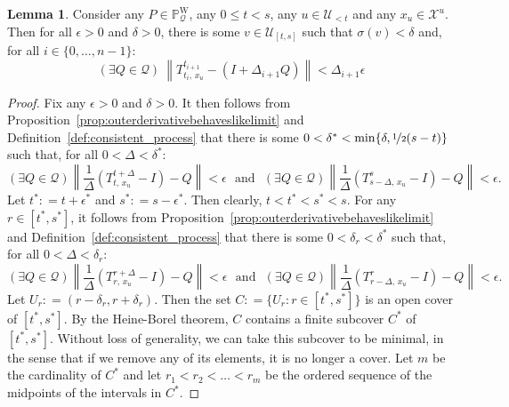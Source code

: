 \documentclass[10pt,a4paper]{paper}
\theoremstyle{definition}
\newtheorem{lemma}[theorem]{Lemma}
\newcommand{\states}{\mathcal{X}}
\newcommand{\processes}{\mathbb{P}}
\newcommand{\wprocesses}{\processes^{\mathrm{W}}}
\newcommand{\rateset}{\mathcal{Q}}
\newcommand{\norm}[1]{\left\lVert #1 \right\rVert}
\newcommand{\coloneqq}{:\!=}
\begin{document}
\begin{lemma}\label{lemma:bound_on_linear_approx_partition}
Consider any $P\in\wprocesses_\rateset$, any $0\leq t<s$, any $u\in\mathcal{U}_{<t}$ and any $x_u\in\states^u$. Then for all $\epsilon>0$ and $\delta>0$, there is some $v\in\mathcal{U}_{[t,s]}$ such that $\sigma(v)<\delta$ and, for all $i\in\{0,\dots,n-1\}$:
\begin{equation*}
(\exists Q\in\rateset)
~
\norm{
T^{t_{i+1}}_{t_i,\,x_u}-(I+\Delta_{i+1}Q)
}<\Delta_{i+1}\epsilon
\end{equation*}
\end{lemma}
\begin{proof}
Fix any $\epsilon>0$ and $\delta>0$. It then follows from Proposition~\ref{prop:outerderivativebehaveslikelimit} and Definition~\ref{def:consistent_process} that there is some $0<\delta^*<\min\{\delta,\nicefrac{1}{2}(s-t)\}$ such that, for all $0<\Delta<\delta^*$:
\begin{equation}\label{eq:epsilonboundsforboundsinlemma}
(\exists Q\in\rateset)
\norm{\frac{1}{\Delta}
(T^{t+\Delta}_{t,\,x_u}-I)-Q}<\epsilon
\text{~~and~~}
(\exists Q\in\rateset)
\norm{\frac{1}{\Delta}
(T^{s}_{s-\Delta,\,x_u}-I)-Q}<\epsilon.
\end{equation}
Let $t^*\coloneqq t+\epsilon^*$ and $s^*\coloneqq s-\epsilon^*$. Then clearly, $t<t^*<s^*<s$.
For any $r\in[t^*,s^*]$, it follows from Proposition~\ref{prop:outerderivativebehaveslikelimit} and Definition~\ref{def:consistent_process} that there is some $0<\delta_r<\delta^*$ such that, for all $0<\Delta<\delta_r$:
\begin{equation}\label{eq:epsilonboundsforlemma}
(\exists Q\in\rateset)
\norm{\frac{1}{\Delta}
(T^{r+\Delta}_{r,\,x_u}-I)-Q}<\epsilon
\text{~~and~~}
(\exists Q\in\rateset)
\norm{\frac{1}{\Delta}
(T^{r}_{r-\Delta,\,x_u}-I)-Q}<\epsilon.
\end{equation}
Let $U_r\coloneqq(r-\delta_r,r+\delta_r)$. Then the set $C\coloneqq\{U_r\colon r\in[t^*,s^*]\}$ is an open cover of $[t^*,s^*]$. By the Heine-Borel theorem, $C$ contains a finite subcover $C^*$ of $[t^*,s^*]$. Without loss of generality, we can take this subcover to be minimal, in the sense that if we remove any of its elements, it is no longer a cover. Let $m$ be the cardinality of $C^*$ and let $r_1<r_2<\dots<r_m$ be the ordered sequence of the midpoints of the intervals in $C^*$.


\end{proof}
\end{document}
